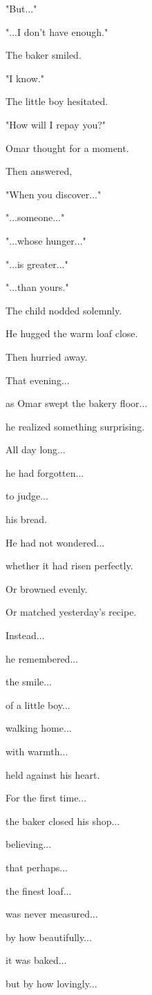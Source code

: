 \documentclass[12pt,openany]{book}
\begin{document}
"But..."

"...I don't have enough."

The baker smiled.

"I know."

The little boy hesitated.

"How will I repay you?"

Omar thought for a moment.

Then answered,

"When you discover..."

"...someone..."

"...whose hunger..."

"...is greater..."

"...than yours."

The child nodded solemnly.

He hugged the warm loaf close.

Then hurried away.

That evening...

as Omar swept the bakery floor...

he realized something surprising.

All day long...

he had forgotten...

to judge...

his bread.

He had not wondered...

whether it had risen perfectly.

Or browned evenly.

Or matched yesterday's recipe.

Instead...

he remembered...

the smile...

of a little boy...

walking home...

with warmth...

held against his heart.

For the first time...

the baker closed his shop...

believing...

that perhaps...

the finest loaf...

was never measured...

by how beautifully...

it was baked...

but by how lovingly...
\end{document}
